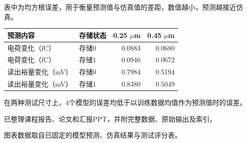 \documentclass[UTF8,fontset=fandol,10pt,a4paper]{ctexart}
\newcommand{\sect}[1]{\par\vspace{9pt}{\large\bfseries #1}\par\vspace{4pt}}
\newcommand{\note}[1]{\par{\footnotesize\color{muted}#1}\par}
\begin{document}
\sect{测试误差}
\note{表中为均方根误差，用于衡量预测值与仿真值的差距，数值越小，预测越接近仿真。}
\renewcommand{\arraystretch}{1.4}
\begin{tabularx}{\textwidth}{@{}Xlrr@{}}
\toprule
预测内容 & 存储状态 & 0.25 $\mu$m & 0.45 $\mu$m \\
\midrule
电荷变化（fC） & 存储0 & 0.0883 & 0.0680 \\
电荷变化（fC） & 存储1 & 0.0946 & 0.0672 \\
读出裕量变化（mV） & 存储0 & 0.7984 & 0.5194 \\
读出裕量变化（mV） & 存储1 & 0.8380 & 0.5049 \\
\bottomrule
\end{tabularx}\par
\vspace{9pt}
在两种测试尺寸上，4个模型的误差均低于以训练数据均值作为预测值时的误差。

\vfill
\sect{现有材料}
已整理课程报告、论文和汇报PPT，并附完整数据、原始输出及索引。
\note{图表数据取自已固定的模型预测、仿真结果与测试评分表。}
\end{document}
